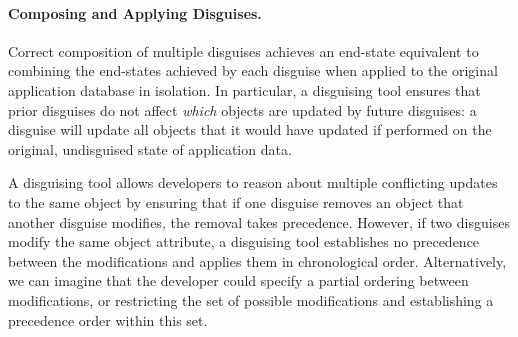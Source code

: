\paragraph{Composing and Applying Disguises.}
Correct composition of multiple disguises achieves an end-state equivalent to combining the
end-states achieved by each disguise when applied to the original application database in isolation.
%
In particular, a disguising tool ensures that prior disguises do not affect \emph{which} objects are updated
by future disguises: a disguise will update all objects that it would have updated if performed on
the original, undisguised state of application data.

A disguising tool allows developers to reason about multiple conflicting updates to the same object by ensuring that
if one disguise removes an object that another disguise modifies, the removal takes
precedence.
%
However, if two disguises modify the same object attribute, a disguising tool
establishes no precedence between the modifications and applies them in chronological order.
Alternatively, we can imagine that the developer could specify a partial ordering between
modifications, or restricting the set of possible modifications and establishing a precedence order
within this set.

